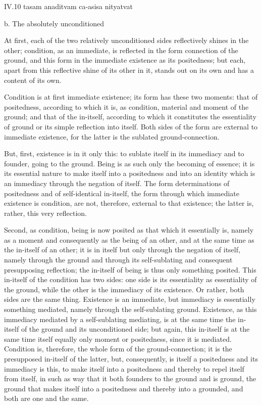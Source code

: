 IV.10
tasam anaditvam ca-asisa nityatvat

b. The absolutely unconditioned

At first, each of the two relatively unconditioned sides
reflectively shines in the other;
condition, as an immediate, is reflected
in the form connection of the ground,
and this form in the immediate existence as its positedness;
but each, apart from this reflective shine of its other in it,
stands out on its own and has a content of its own.

Condition is at first immediate existence;
its form has these two moments:
that of positedness, according to which it is, as condition,
material and moment of the ground;
and that of the in-itself, according to which
it constitutes the essentiality of ground
or its simple reflection into itself.
Both sides of the form are external to immediate existence,
for the latter is the sublated ground-connection.

But, first, existence is in it only this:
to sublate itself in its immediacy
and to founder, going to the ground.
Being is as such only the becoming of essence;
it is its essential nature to
make itself into a positedness
and into an identity which is
an immediacy through the negation of itself.
The form determinations of positedness
and of self-identical in-itself,
the form through which immediate existence is condition,
are not, therefore, external to that existence;
the latter is, rather, this very reflection.

Second, as condition, being is now posited as
that which it essentially is,
namely as a moment and consequently as the being of an other,
and at the same time as the in-itself of an other;
it is in itself but only through the negation of itself,
namely through the ground and through its self-sublating
and consequent presupposing reflection;
the in-itself of being is thus only something posited.
This in-itself of the condition has two sides:
one side is its essentiality as essentiality of the ground,
while the other is the immediacy of its existence.
Or rather, both sides are the same thing.
Existence is an immediate, but immediacy
is essentially something mediated,
namely through the self-sublating ground.
Existence, as this immediacy mediated by a self-sublating mediating,
is at the same time the in-itself of the ground and its unconditioned side;
but again, this in-itself is at the same time itself
equally only moment or positedness, since it is mediated.
Condition is, therefore, the whole form of the ground-connection;
it is the presupposed in-itself of the latter,
but, consequently, is itself a positedness
and its immediacy is this, to make itself into a positedness
and thereby to repel itself from itself,
in such as way that it both founders to the ground and is ground,
the ground that makes itself into a positedness
and thereby into a grounded, and both are one and the same.

